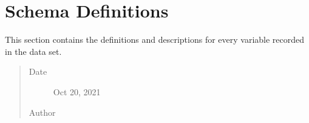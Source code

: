 \documentclass[letterpaper,10pt,english]{sphinxmanual}
\begin{document}
\section{Schema Definitions}
\label{\detokenize{schema_tables:schema-definitions}}
\begin{sphinxShadowBox}

\sphinxAtStartPar
This section contains the definitions and descriptions for every variable recorded in the data set.
\begin{quote}\begin{description}
\item[{Date}] \leavevmode
\sphinxAtStartPar
Oct 20, 2021

\item[{Author}] \leavevmode
\sphinxAtStartPar
{}

\end{description}\end{quote}
\end{sphinxShadowBox}
\end{document}
